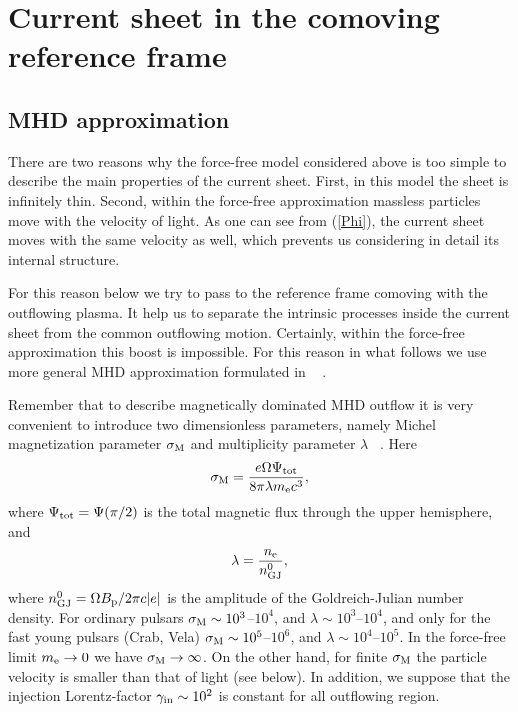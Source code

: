 \documentclass[useAMS,usenatbib]{mn2e}
\begin{document}
\section{Current sheet in the comoving reference frame}
\label{sect:fields}

\subsection{MHD approximation}

There are two reasons why the force-free model considered above is
too simple to describe the main properties of the current sheet. First, in
this model the sheet is infinitely thin. Second, within the force-free
approximation massless particles move with the velocity of light. As one
can see from (\ref{Phi}), the current sheet moves with the same velocity as
well, which prevents us considering in detail its internal structure.

For this reason below we try to pass to the reference frame comoving with the
outflowing plasma. It help us to separate the intrinsic processes inside the
current sheet from the common outflowing motion. Certainly, within the force-free
approximation this boost is impossible. For this reason in what follows we use
more general MHD approximation formulated in ~\citet{2000MNRAS.313..433B} 
\citep[see also][]{beszak04}.

Remember that to describe magnetically dominated MHD outflow it is very convenient
to introduce two dimensionless parameters, namely Michel magnetization parameter
$\sigma_{\rm M}$ and multiplicity parameter $\lambda$ ~\citep{2010mfca.book.....B}. Here
\begin{equation}
\sigma_{\rm M} = \frac{e\Omega \Psi_{\rm tot}}{8 \pi \lambda m_{\rm e}c^3},
\label{sigma}
\end{equation}
where $\Psi_{\rm tot} = \Psi(\pi/2)$ is the total magnetic flux through the upper
hemisphere, and
\begin{equation}
\lambda = \frac{n_{\rm e}}{n^{0}_{\rm GJ}},
\end{equation}
where $n^{0}_{\rm GJ} = \Omega B_{\rm p}/2\pi c |e|$ is the amplitude of the Goldreich-Julian 
number density. For ordinary pulsars \mbox{$\sigma_{\rm M} \sim 10^3$--$10^4$,} and 
$\lambda \sim 10^3$--$10^4$, and only for the fast young pulsars (Crab, Vela)
\mbox{$\sigma_{\rm M} \sim 10^5$--$10^6$,} and $\lambda \sim 10^4$--$10^5$. In the force-free 
limit $m_{\rm e} \rightarrow 0$ we have $\sigma_{\rm M} \rightarrow \infty$. On the other hand, 
for finite $\sigma_{\rm M}$ the particle velocity is smaller than that of light (see below). In 
addition, we suppose that the injection Lorentz-factor $\gamma_{\rm in} \sim 10^2$ is constant 
for all outflowing region.
\end{document}

